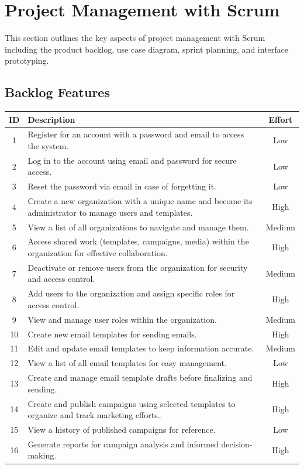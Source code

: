 \newpage
\section{Project Management with Scrum}

This section outlines the key aspects of project management with Scrum including the product backlog, use case diagram, sprint planning, and interface prototyping.

\subsection{Backlog Features}

\begin{longtable}{|c|p{}|c|}
	\hline
	\textbf{ID} & \textbf{Description} & \textbf{Effort} \\
	\hline
	1           & Register for an account with a password and email to access the system. & Low \\
	\hline
	2           & Log in to the account using email and password for secure access. & Low \\
	\hline
	3           & Reset the password via email in case of forgetting it. & Low \\
	\hline
	4           & Create a new organization with a unique name and become its administrator to manage users and templates. & High \\
	\hline
	5           & View a list of all organizations to navigate and manage them. & Medium \\
	\hline
	6           & Access shared work (templates, campaigns, media) within the organization for effective collaboration. & High \\
	\hline
	7           & Deactivate or remove users from the organization for security and access control. & Medium \\
	\hline
	8           & Add users to the organization and assign specific roles for access control. & High \\
	\hline
	9           & View and manage user roles within the organization. & Medium \\
	\hline
	10          & Create new email templates for sending emails. & High \\
	\hline
	11          & Edit and update email templates to keep information accurate. & Medium \\
	\hline
	12          & View a list of all email templates for easy management. & Low \\
	\hline
	13          & Create and manage email template drafts before finalizing and sending. & High \\
	\hline
	14          & Create and publish campaigns using selected templates to organize and track marketing efforts.. & High \\
	\hline
	15          & View a history of published campaigns for reference. & Low \\
	\hline
	16          & Generate reports for campaign analysis and informed decision-making. & High \\
	\hline
\end{longtable}

